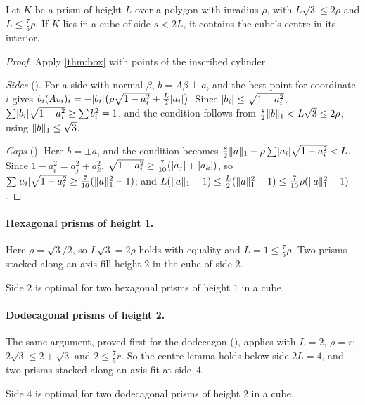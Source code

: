 \documentclass[11pt,a4paper]{article}
\begin{document}
\begin{theorem}\label{thm:pcentre}
Let $K$ be a prism of height $L$ over a polygon with inradius $\rho$, with $L\sqrt3\le2\rho$ and $L\le\tfrac75\rho$. If $K$ lies in a cube of side $s<2L$, it contains the cube's centre in its interior.
\end{theorem}
\begin{proof}
Apply \cref{thm:box} with points of the inscribed cylinder.

\emph{Sides} (). For a side with normal $\beta$, $b=A\beta\perp a$, and the best point for coordinate $i$ gives $b_i(Av_i)_i=-\lvert b_i\rvert\bigl(\rho\sqrt{1-a_i^2}+\tfrac L2\lvert a_i\rvert\bigr)$. Since $\lvert b_i\rvert\le\sqrt{1-a_i^2}$, $\sum\lvert b_i\rvert\sqrt{1-a_i^2}\ge\sum b_i^2=1$, and the condition follows from $\tfrac s2\lVert b\rVert_1<L\sqrt3\le2\rho$, using $\lVert b\rVert_1\le\sqrt3$.

\emph{Caps} (). Here $b=\pm a$, and the condition becomes $\tfrac s2\lVert a\rVert_1-\rho\sum\lvert a_i\rvert\sqrt{1-a_i^2}<L$. Since $1-a_i^2=a_j^2+a_k^2$, $\sqrt{1-a_i^2}\ge\tfrac{7}{10}(\lvert a_j\rvert+\lvert a_k\rvert)$, so $\sum\lvert a_i\rvert\sqrt{1-a_i^2}\ge\tfrac7{10}(\lVert a\rVert_1^2-1)$; and $L(\lVert a\rVert_1-1)\le\tfrac L2(\lVert a\rVert_1^2-1)\le\tfrac7{10}\rho(\lVert a\rVert_1^2-1)$.
\end{proof}

\paragraph{Hexagonal prisms of height 1.} Here $\rho=\sqrt3/2$, so $L\sqrt3=2\rho$ holds with equality and $L=1\le\tfrac75\rho$. Two prisms stacked along an axis fill height $2$ in the cube of side $2$.

\begin{theorem}
Side $2$ is optimal for two hexagonal prisms of height $1$ in a cube.
\end{theorem}

\paragraph{Dodecagonal prisms of height 2.} The same argument, proved first for the dodecagon (), applies with $L=2$, $\rho=r$: $2\sqrt3\le2+\sqrt3$ and $2\le\tfrac75r$. So the centre lemma holds below side $2L=4$, and two prisms stacked along an axis fit at side~$4$.

\begin{theorem}
Side $4$ is optimal for two dodecagonal prisms of height $2$ in a cube.
\end{theorem}
\end{document}

